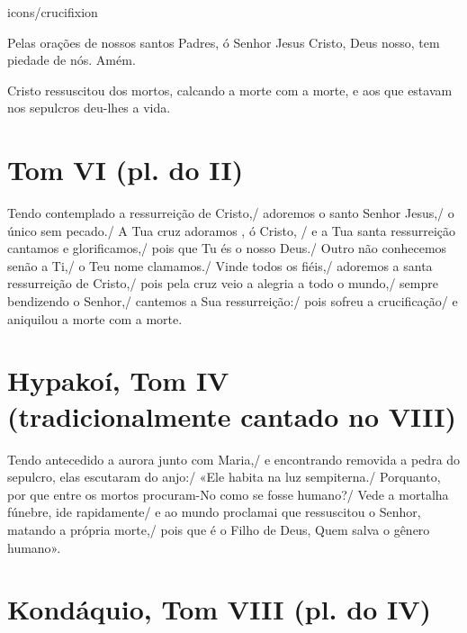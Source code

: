 \documentclass{subfiles}
\begin{document}
\begin{chapterimg}[height=\textheight]{icons/crucifixion}
\end{chapterimg}



Pelas orações de nossos santos Padres, ó Senhor Jesus Cristo, 
Deus nosso, tem piedade de nós. Amém.  

Cristo ressuscitou dos mortos, calcando a morte com a morte, e aos que estavam
nos sepulcros deu-lhes a vida. \thrice{}

\section*{Tom VI (pl. do II)}

Tendo contemplado a ressurreição de Cristo,/ adoremos \cross{} o santo Senhor Jesus,/ o
único sem pecado./ A Tua cruz adoramos \cross{}, ó Cristo, / e a Tua santa ressurreição
cantamos e glorificamos,/ pois que Tu és o nosso Deus./ Outro não conhecemos
senão a Ti,/ o Teu nome clamamos./ Vinde todos os fiéis,/ adoremos \cross{} a santa
ressurreição de Cristo,/ pois pela cruz veio a alegria a todo o mundo,/ sempre
bendizendo o Senhor,/ cantemos a Sua ressurreição:/ pois sofreu a crucificação/
e aniquilou a morte com a morte. \thrice{}

\section*{Hypakoí, Tom IV (tradicionalmente cantado no VIII)}

Tendo antecedido a aurora junto com Maria,/ e encontrando removida a pedra do
sepulcro, elas escutaram do anjo:/ «Ele habita na luz sempiterna./ Porquanto,
por que entre os mortos procuram-No como se fosse humano?/ Vede a mortalha
fúnebre, ide rapidamente/ e ao mundo proclamai que ressuscitou o Senhor, matando
a própria morte,/ pois que é o Filho de Deus, Quem salva o gênero humano». 

\section*{Kondáquio, Tom VIII (pl. do IV)}
\end{document}
